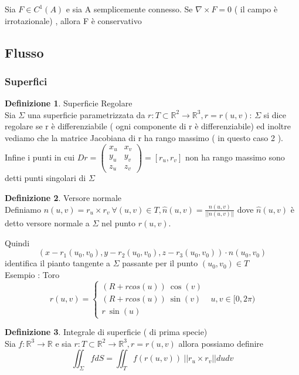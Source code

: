 \documentclass{article}
\theoremstyle{definition}
\newtheorem*{definizione}{Definizione}
\newcommand{\R}{\mathbb{R}}
\begin{document}
	\begin{teo}{}{}
		Sia $F\in C^1(A)$ e sia A semplicemente connesso. Se $\nabla \times F=0$ ( il campo è irrotazionale) , allora F è conservativo
	\end{teo}
	\subsection{Flusso}
\subsubsection{Superfici}
\begin{definizione}
	Superficie Regolare \\
	Sia $\Sigma$ una superficie parametrizzata da $r : T \subset \R^2 \rightarrow \R^3 , r=r(u,v)$: $\Sigma$ si dice regolare se r è differenziabile ( ogni componente di r è differenziabile) ed inoltre vediamo che la matrice Jacobiana di r ha rango massimo ( in questo caso 2 ). Infine i punti in cui $Dr=\begin{pmatrix}
	x_u & x_v \\
	y_u & y_v \\
	z_u & z_v	\end{pmatrix}=[r_u,r_v]$ non ha rango massimo sono detti punti singolari di  $\Sigma$	\end{definizione}
\begin{definizione}
	Versore normale \\
	Definiamo $n(u,v)=r_u \times r_v \ \forall (u,v) \in T , \hat{n}(u,v)=\frac{n(u,v)}{||n(u,v)||}$ dove $\hat{n}(u,v)$ è detto versore normale a $\Sigma$ nel punto $r(u,v)$.
	\end{definizione}
Quindi $$(x-r_1(u_0,v_0),y-r_2(u_0,v_0),z-r_3(u_0,v_0))\cdot n(u_0,v_0)$$ identifica il pianto tangente a $\Sigma$ passante per il punto $(u_0,v_0)\in T$\\
Esempio : Toro 
$$r(u,v)=\begin{cases}
	(R+rcos(u))\ \cos(v) \\
	(R+rcos(u))\ \sin(v)\\
	r\ \sin(u)
\end{cases} \ \ \ u,v \in [0,2\pi)$$
\begin{definizione}
	Integrale di superficie ( di prima specie) \\
	Sia  $f:\R^3 \rightarrow \R$ e sia $r: T\subset \R^2 \rightarrow \R^3  , r=r(u,v)$ allora possiamo definire 
	$$\iint_{\Sigma}f dS=\iint_T f(r(u,v)) \ ||r_u \times r_v|| du dv$$
	\end{definizione}
\end{document}
